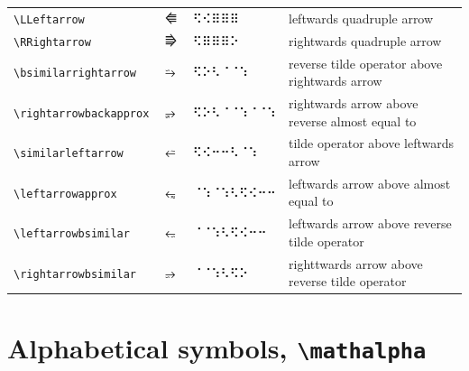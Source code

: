 \documentclass[oneside]{article}
\begin{document}
\begin{longtable}{llll}
\verb|\LLeftarrow| & $\LLeftarrow$ &   ⠫⠪⠿⠿⠿   & {leftwards quadruple arrow} \\[2ex]
\verb|\RRightarrow| & $\RRightarrow$ &   ⠫⠿⠿⠿⠕   & {rightwards quadruple arrow} \\[2ex]
\verb|\bsimilarrightarrow| & $\bsimilarrightarrow$ &   ⠫⠕⠣⠈⠈⠱   & {reverse tilde operator above rightwards arrow} \\[2ex]
\verb|\rightarrowbackapprox| & $\rightarrowbackapprox$ &   ⠫⠕⠣⠈⠈⠱⠈⠈⠱   & {rightwards arrow above reverse almost equal to} \\[2ex]
\verb|\similarleftarrow| & $\similarleftarrow$ &   ⠫⠪⠒⠒⠣⠈⠱   & {tilde operator above leftwards arrow} \\[2ex]
\verb|\leftarrowapprox| & $\leftarrowapprox$ &   ⠈⠱⠈⠱⠣⠫⠪⠒⠒   & {leftwards arrow above almost equal to} \\[2ex]
\verb|\leftarrowbsimilar| & $\leftarrowbsimilar$ &   ⠈⠈⠱⠣⠫⠪⠒⠒   & {leftwards arrow above reverse tilde operator} \\[2ex]
\verb|\rightarrowbsimilar| & $\rightarrowbsimilar$ &   ⠈⠈⠱⠣⠫⠕   & {righttwards arrow above reverse tilde operator} \\[2ex]
\end{longtable}


\clearpage

\section{Alphabetical symbols, \texttt{\textbackslash{}mathalpha}}
\end{document}

